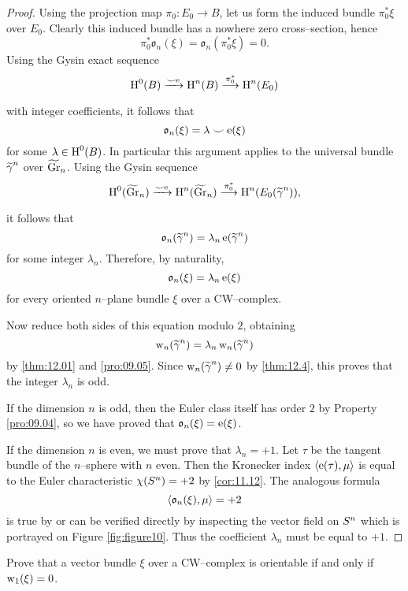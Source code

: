 \documentclass[../main]{subfiles}
\begin{document}
\begin{proof}
Using the projection map $\pi_0 : E_0 \longrightarrow B$, let us form the induced bundle $\pi_0^\ast \xi$ over $E_0$. Clearly this induced bundle has a nowhere zero cross--section, hence \[\pi_0^\ast {\mathfrak o}_n(\xi) = {\mathfrak o}_n(\pi_0^\ast \xi) = 0.\] Using the Gysin exact sequence \[\homology^0(B) \varrightarrow{\smile \eulerclass} \homology^n(B) \varrightarrow{\pi_0^\ast} \homology^n(E_0)\] with integer coefficients, it follows that \[{\mathfrak o}_n(\xi) = \lambda \smile \operatorname{e}(\xi)\] for some $\lambda \in \operatorname{H}^0(B)$. In particular this argument applies to the universal bundle ${\xtilde \gamma}^n$ over ${\xtilde \grassmannian}_n$. Using the Gysin sequence \[\homology^0({\xtilde \grassmannian}_n) \varrightarrow{\smile \eulerclass} \homology^n({\xtilde \grassmannian}_n) \varrightarrow{\pi_0^\ast} \homology^n(E_0({\xtilde \gamma}^n)),\] it follows that \[{\mathfrak o}_n({\xtilde \gamma}^n) = \lambda_n \eulerclass({\xtilde \gamma}^n)\] for some integer $\lambda_n$. Therefore, by naturality, \[{\mathfrak o}_n(\xi) = \lambda_n \operatorname{e}(\xi)\] for every oriented $n$--plane bundle $\xi$ over a CW--complex.

Now reduce both sides of this equation modulo $2$, obtaining \[\sw_n({\xtilde \gamma}^n) = \lambda_n \sw_n({\xtilde \gamma}^n)\] by \ref{thm:12.01} and \ref{pro:09.05}. Since $\sw_n({\xtilde \gamma}^n) \ne 0$ by \ref{thm:12.4}, this proves that the integer $\lambda_n$ is odd. 

If the dimension $n$ is odd, then the Euler class itself has order $2$ by Property \ref{pro:09.04}, so we have proved that ${\mathfrak o}_n(\xi) = \operatorname{e}(\xi)$.

If the dimension $n$ is even, we must prove that $\lambda_n = +1$. Let $\tau$ be the tangent bundle of the $n$--sphere with $n$ even. Then the Kronecker index $\langle\operatorname{e}(\tau),\mu\rangle$ is equal to the Euler characteristic $\chi(S^n) = +2$ by \ref{cor:11.12}. The analogous formula \[\langle{\mathfrak o}_n(\xi),\mu\rangle = +2\] is true by \cite[\S39.6]{steenrod1951} or can be verified directly by inspecting the vector field on $S^n$ which is portrayed on Figure \ref{fig:figure10}. Thus the coefficient $\lambda_n$ must be equal to $+1$. 
\end{proof}

\begin{problem}\label{prob:12.A}
Prove that a vector bundle $\xi$ over a CW--complex is orientable if and only if $\operatorname{w}_1(\xi) = 0$.
\end{problem}
\end{document}
